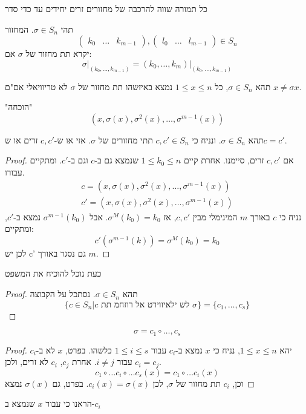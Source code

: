 \documentclass{tstextbook}
\begin{document}
\begin{proposition}
כל תמורה שווה להרכבה של מחזורים זרים יחידים עד כדי סדר

\end{proposition}
\begin{definition}[תת מחזור]
תהי \(\sigma \in S_{n}\). המחזור 
$$\begin{pmatrix} k_{0}& \dots & k_{m-1}\end{pmatrix},\begin{pmatrix} l_{0}& \dots & l_{m-1}\end{pmatrix}\in S_{n}$$
 יקרא תת מחזור של \(\sigma\) אם:
$$\sigma\big|_{(k_{0},\dots,k_{m-1})} = (k_{0},\dots,k_{m})\big|_{(k_{0},\dots,k_{m-1})}$$

\end{definition}
\begin{lemma}
תהא \(\sigma \in S_{n}\), כל  \(1\leq x\leq n\) נמצא באיזשהו תת מחזור של \(\sigma\) לא טריוויאלי אם"ם \(x\neq \sigma x\).

\end{lemma}
"הוכחה"
$$(x,\sigma(x),\sigma^2(x),\dots,\sigma^{m-1}(x))$$

\begin{lemma}
תהא \(\sigma \in S_{n}\). ונניח כי \(c,c' \in S_{n}\) תתי מחזורים של \(\sigma\). אזי או ש-\(c,c'\) זרים או ש\(c=c'\).

\end{lemma}
\begin{proof}
אם \(c,c'\) זרים, סיימנו.
אחרת קיים \(1\leq k_{0}\leq n\) שנמצא גם ב-\(c\) וגם ב-\(c'\). ומתקיים עבורו.
\begin{gather*}c=(x,\sigma(x),\sigma^2(x),\dots,\sigma^{m-1}(x)) \\c'=(x,\sigma(x),\sigma^2(x),\dots,\sigma^{m-1}(x))
\end{gather*}
נניח כי \(c\) באורך \(m\) המינימלי מבין \(c,c'\), אז \(\sigma^M(k_{0})=k_{0}\). אבל \(\sigma^{m-1}(k_{0})\) נמצא ב-\(c'\), ומתקיים:
$$c'(\sigma^{m-1}(k))=\sigma^M(k_{0})=k_{0}$$
לכן יש c' גם נסגר באורך \(m\).

\end{proof}
כעת נוכל להוכיח את המשפט

\begin{proof}
תהא \(\sigma \in S_{n}\). נסתכל על הקבוצה
$$\{ c \in S_{n} \big|c\text{ לש ילאיווירט אל רוזחמ תת }\sigma \}=\{ c_{1},\dots,c_{s} \}$$

\end{proof}
\begin{proposition}
$$\sigma=c_{1}\circ\dots,c_{s}$$

\end{proposition}
\begin{proof}
יהא \(1\leq x\leq n\), נניח כי \(x\) נמצא ב-\(c_{i}\) עבור \(1\leq i\leq s\) כלשהו. 
בפרט, \(x\) לא ב-\(c_{i}\) עבור \(i\neq j\). אחרת \(c_j\), \(c_{i}\) לא זרים, ולכן \(c_{i}=c_{j}\).
$$c_{1}\circ \dots c_{i}\circ \dots c_{s}(x)=c_{1}\circ \dots c_{i}(x)$$
וכן, \(c_{i}\) תת מחזור של \(\sigma\), לכן \(c_{i}(x)=\sigma(x)\). בפרט, גם \(\sigma(x)\) נמצא

\end{proof}
הראנו כי עבור \(x\) שנמצא ב-\(c_i\)
\end{document}
